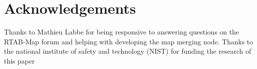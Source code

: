 \documentclass[letterpaper, 10 pt, conference]{ieeeconf}  %
\begin{document}
\section*{Acknowledgements}
Thanks to Mathieu Labbe for being responsive to answering questions on the RTAB-Map forum and helping with developing the map merging node. Thanks to the national institute of safety and technology (NIST) for funding the research of this paper

\end{document}
